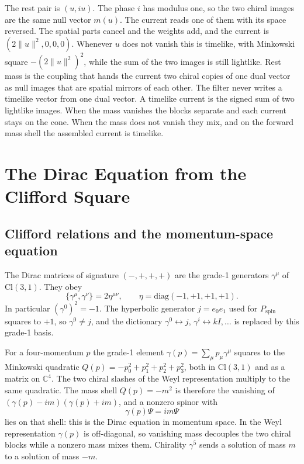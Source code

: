 \documentclass[a4paper]{article}
\begin{document}
The rest pair is $(u,iu)$. The phase $i$ has modulus one, so the two chiral images are the same null vector $m(u)$. The current reads one of them with its space reversed. The spatial parts cancel and the weights add, and the current is $(2\lVert u\rVert^2,0,0,0)$. Whenever $u$ does not vanish this is timelike, with Minkowski square $-(2\lVert u\rVert^2)^2$, while the sum of the two images is still lightlike. Rest mass is the coupling that hands the current two chiral copies of one dual vector as null images that are spatial mirrors of each other. The filter never writes a timelike vector from one dual vector. A timelike current is the signed sum of two lightlike images. When the mass vanishes the blocks separate and each current stays on the cone. When the mass does not vanish they mix, and on the forward mass shell the assembled current is timelike.

\section{The Dirac Equation from the Clifford Square}
\label{sec:dirac}

\subsection{Clifford relations and the momentum-space equation}

The Dirac matrices of signature $(-,+,+,+)$ are the grade-1 generators $\gamma^\mu$ of $\mathrm{Cl}(3,1)$. They obey
\[
\{\gamma^\mu,\gamma^\nu\}=2\eta^{\mu\nu},\qquad
\eta=\mathrm{diag}(-1,+1,+1,+1).
\]
In particular $(\gamma^0)^2=-1$. The hyperbolic generator $j=e_0 e_1$ used for $P_{\mathrm{spin}}$ squares to $+1$, so $\gamma^0\neq j$, and the dictionary $\gamma^0\leftrightarrow j$, $\gamma^i\leftrightarrow kI,\ldots$ is replaced by this grade-1 basis.

For a four-momentum $p$ the grade-1 element $\gamma(p)=\sum_\mu p_\mu\gamma^\mu$ squares to the Minkowski quadratic $Q(p)=-p_0^2+p_1^2+p_2^2+p_3^2$, both in $\mathrm{Cl}(3,1)$ and as a matrix on $\mathbb{C}^4$. The two chiral slashes of the Weyl representation multiply to the same quadratic. The mass shell $Q(p)=-m^2$ is therefore the vanishing of $(\gamma(p)-im)(\gamma(p)+im)$, and a nonzero spinor with
\[
\gamma(p)\Psi=im\Psi
\]
lies on that shell: this is the Dirac equation in momentum space. In the Weyl representation $\gamma(p)$ is off-diagonal, so vanishing mass decouples the two chiral blocks while a nonzero mass mixes them. Chirality $\gamma^5$ sends a solution of mass $m$ to a solution of mass $-m$.
\end{document}
